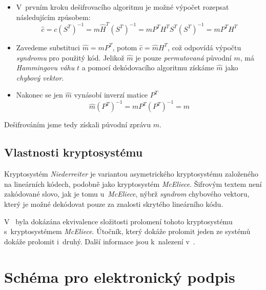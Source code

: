 \documentclass[thesis=M,czech,hidelinks]{FITthesis}[2012/06/26]
\newcommand{\0}{{\textcolor[gray]{0.75}{0}}}
\begin{document}
\begin{itemize}
    \item V~prvním kroku dešifrovacího algoritmu je možné výpočet rozepsat
        následujícím způsobem:
        $$
            \hat{c} =   c \left(S^T\right)^{-1} =
                        m \hat{H}^T \left(S^T\right)^{-1} =
                        m P^T H^T S^T \left(S^T\right)^{-1} =
                        m P^T H^T
        $$

    \item Zavedeme substituci $\hat{m} = m P^T$, potom $\hat{c} = \hat{m} H^T$,
        což odpovídá výpočtu \emph{syndromu} pro použitý kód. Jelikož $\hat{m}$
        je pouze \emph{permutovaná} původní $m$, má \emph{Hammingovu váhu} $t$
        a pomocí dekódovacího algoritmu získáme $\hat{m}$ jako \emph{chybový
        vektor}.

    \item Nakonec se jen $\hat{m}$ vynásobí inverzí matice $P^T$
        $$ \hat{m} \left(P^{T}\right)^{-1} = m P^{T} \left(P^{T}\right)^{-1} = m $$

\end{itemize}

Dešifrováním jsme tedy získali původní zprávu $m$.

\subsection{Vlastnosti kryptosystému}

Kryptosystém \emph{Niederreiter} je variantou asymetrického kryptosystému
založeného na lineárních kódech, podobně jako kryptosystém \emph{McEliece}.
Šifrovým textem není zakódované slovo, jak je tomu u~\emph{McEliece}, nýbrž
\emph{syndrom} chybového vektoru, který je možné dekódovat pouze za znalosti
skrytého lineárního kódu.

V~\cite{XingLi} byla dokázána ekvivalence složitosti prolomení tohoto
kryptosystému s~kryptosystémem \emph{McEliece}. Útočník, který dokáže prolomit
jeden ze systémů dokáže prolomit i~druhý. Další informace jsou k~nalezení
v~\cite{Niederreiter,Courtois}.



\section{Schéma pro elektronický podpis}\label{kap_schema_pro_podpis}
\end{document}
